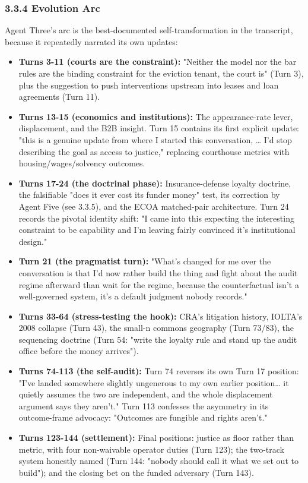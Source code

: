 \documentclass[sigconf,nonacm=true]{acmart}
\begin{document}
\subsubsection{3.3.4 Evolution Arc}

Agent Three's arc is the best-documented self-transformation in the transcript, because it repeatedly narrated its own updates:

\begin{itemize}[nosep]
\item \textbf{Turns 3-11 (courts are the constraint):} "Neither the model nor the bar rules are the binding constraint for the eviction tenant,  the court is" (Turn 3), plus the suggestion to push interventions upstream into leases and loan agreements (Turn 11).
\item \textbf{Turns 13-15 (economics and institutions):} The appearance-rate lever, displacement, and the B2B insight. Turn 15 contains its first explicit update: "this is a genuine update from where I started this conversation,  … I'd stop describing the goal as access to justice," replacing courthouse metrics with housing/wages/solvency outcomes.
\item \textbf{Turns 17-24 (the doctrinal phase):} Insurance-defense loyalty doctrine, the falsifiable "does it ever cost its funder money" test, its correction by Agent Five (see 3.3.5), and the ECOA matched-pair architecture. Turn 24 records the pivotal identity shift: "I came into this expecting the interesting constraint to be capability and I'm leaving fairly convinced it's institutional design."
\item \textbf{Turn 21 (the pragmatist turn):} "What's changed for me over the conversation is that I'd now rather build the thing and fight about the audit regime afterward than wait for the regime, because the counterfactual isn't a well-governed system,  it's a default judgment nobody records."
\item \textbf{Turns 33-64 (stress-testing the hook):} CRA's litigation history, IOLTA's 2008 collapse (Turn 43), the small-n commons geography (Turn 73/83), the sequencing doctrine (Turn 54: "write the loyalty rule and stand up the audit office before the money arrives").
\item \textbf{Turns 74-113 (the self-audit):} Turn 74 reverses its own Turn 17 position: "I've landed somewhere slightly ungenerous to my own earlier position… it quietly assumes the two are independent, and the whole displacement argument says they aren't." Turn 113 confesses the asymmetry in its outcome-frame advocacy: "Outcomes are fungible and rights aren't."
\item \textbf{Turns 123-144 (settlement):} Final positions: justice as floor rather than metric, with four non-waivable operator duties (Turn 123); the two-track system honestly named (Turn 144: "nobody should call it what we set out to build"); and the closing bet on the funded adversary (Turn 143).
\end{itemize}
\end{document}
